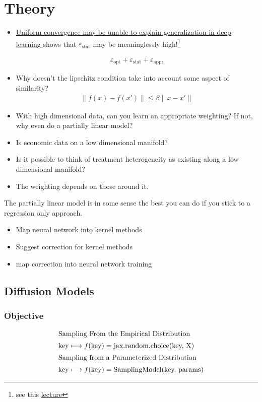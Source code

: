 \documentclass{article}
\begin{document}
\section{Theory}
\begin{itemize}
    \item \href{https://arxiv.org/abs/1902.04742}{Uniform convergence may be unable to explain generalization in deep learning
} shows that $\varepsilon _{\text{stat}}$ may be meaninglessly high!\footnote{see this \href{https://youtu.be/plIJYzVKfdI?list=PLn2-dEmQeTfSLXW8yXP4q_Ii58wFdxb3C&t=1961}{lecture}}

\begin{align*}
\varepsilon _{\text{opt}} + \varepsilon _{\text{stat}} + \varepsilon _{\text{appr}}    
\end{align*}
\item Why doesn't the lipschitz condition take into account some aspect of similarity? 
\begin{align*}
    \| f(x) - f(x') \| \leq \beta \| x- x' \| 
\end{align*}
\end{itemize}
\begin{itemize}
    \item With high dimensional data, can you learn an appropriate weighting? If not, why even do a partially linear model?
    \item Is economic data on a low dimensional manifold? 
    \item Is it possible to think of treatment heterogeneity as existing along a low dimensional manifold?
    \item The weighting depends on those around it. 
\end{itemize}
The partially linear model is in some sense the best you can do if you stick to a regression only approach. 
\begin{itemize}
    \item Map neural network into kernel methods 
    \item Suggest correction for kernel methods 
    \item map correction into neural network training
\end{itemize}
\newpage 
\subsection{Diffusion Models}
\subsubsection{Objective}
\begin{align*}
\intertext{Sampling From the Empirical Distribution}
    &\textrm{key} \longmapsto f(\textrm{key}) = \textrm{jax.random.choice(key, X)} \\ 
\intertext{Sampling from a Parameterized Distribution}
    &\textrm{key} \longmapsto f(\textrm{key}) = \textrm{SamplingModel(key, params)}
\end{align*}
\end{document}

